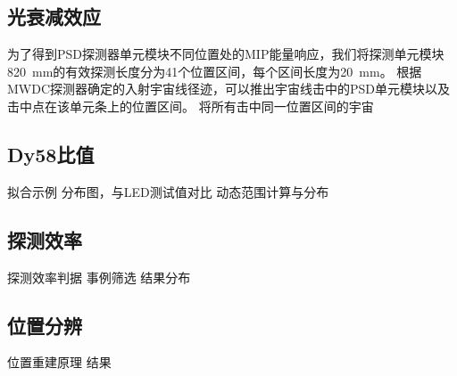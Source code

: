
\subsection{光衰减效应}
为了得到PSD探测器单元模块不同位置处的MIP能量响应，我们将探测单元模块\SI{820}{mm}的有效探测长度分为41个位置区间，每个区间长度为\SI{20}{mm}。
根据MWDC探测器确定的入射宇宙线径迹，可以推出宇宙线击中的PSD单元模块以及击中点在该单元条上的位置区间。
将所有击中同一位置区间的宇宙
\subsection{Dy58比值}
拟合示例
分布图，与LED测试值对比
动态范围计算与分布

\subsection{探测效率}
探测效率判据
事例筛选
结果分布

\subsection{位置分辨}
位置重建原理
结果

